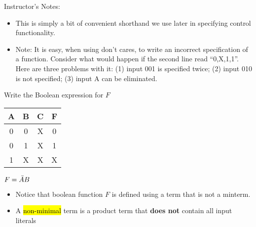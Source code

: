 \BNotes\ifnum{}
\begin{frame}[fragile]
Instructor's Notes:
\begin{itemize}
\item This is simply a bit of convenient shorthand we use later in specifying
	control functionality.

\item Note: It is easy, when using don't cares, to write an incorrect
  specification of a function. Consider what would happen if the
  second line read ``0,X,1,1''. Here are three problems with it: (1)
  input 001 is specified twice; (2) input 010 is not specified; (3)
  input A can be eliminated.
\end{itemize}
\end{frame}
\fi\ENotes

\ifnum{}
\begin{frame}[fragile]
\begin{tcolorbox}[enhanced,attach boxed title to top center={yshift=-3mm,yshifttext=-1mm},
  colback=red!5!white,colframe=red!75!black,colbacktitle=red!80!black,
  title=Try this,fonttitle=\bfseries,
  boxed title style={size=small,colframe=red!50!black} ]
  Write the Boolean expression for $F$  
		\begin{center}
		\begin{tabular}{ccc|c}
		A&B&C & F\\
		\hline
		0&0&X & 0\\
		0&1&X & 1\\
		1&X&X & X\\
		\end{tabular}
		\end{center}
  {\color{red}$F = \Bar{A}B$}
\end{tcolorbox}
\begin{itemize}
    \item Notice that boolean function $F$ is defined using a term that is not a minterm.
    \item A \hl{non-minimal} term is a product term that \textbf{does not} contain all input literals 
\end{itemize}
\end{frame}
\fi

